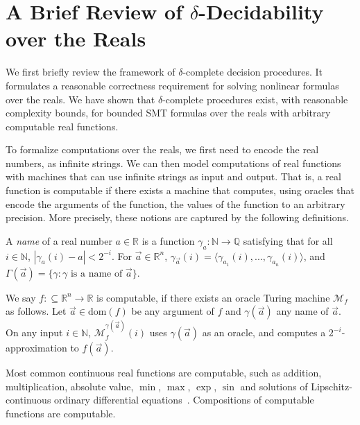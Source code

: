 \documentclass[envcountsect]{llncs}
\newcommand{\dom}{\mathrm{dom}}
\begin{document}
\section{A Brief Review of $\delta$-Decidability over the Reals}\label{review}

We first briefly review the framework of $\delta$-complete decision procedures.
It formulates a reasonable correctness requirement for solving nonlinear
formulas over the reals. We have shown that $\delta$-complete procedures exist,
with reasonable complexity bounds, for bounded SMT formulas over the reals with
arbitrary computable real functions.

To formalize computations over the reals, we first need to encode the real
numbers, as infinite strings. We can then model
computations of real functions with machines that can use infinite strings as
input and output. That is, a real function is computable if there exists a
machine that computes, using oracles that encode the arguments of the function,
the values of the function to an arbitrary precision. More precisely, these
notions are captured by the following definitions.
\begin{definition}
A {\em name} of a real number $a\in \mathbb{R}$ is a function
$\mathcal{\gamma}_a: \mathbb{N}\rightarrow \mathbb{Q}$ satisfying that for all
$i\in \mathbb{N}$, $|\gamma_a(i) - a|<2^{-i}.$ For $\vec a\in \mathbb{R}^n$,
$\gamma_{\vec a}(i) = \langle \gamma_{a_1}(i), ..., \gamma_{a_n}(i)\rangle$, and
$\Gamma(\vec a) = \{\gamma: \gamma\mbox{ is a name of }\vec a\}$.
\end{definition}
\begin{definition} We say
$f:\subseteq\mathbb{R}^n\rightarrow \mathbb{R}$ is computable, if there exists
an oracle Turing machine $\mathcal{M}_f$ as follows. Let $\vec a\in
\dom(f)$ be any argument of $f$ and $\gamma(\vec a)$
any name of $\vec a$. On any input $i\in \mathbb{N}$,
$\mathcal{M}_f^{\gamma(\vec a)}(i)$ uses $\gamma(\vec a)$ as an oracle, and
computes a $2^{-i}$-approximation to $f(\vec a)$.
\end{definition}
Most common continuous real functions are computable, such as addition,
multiplication,  absolute value, $\min$, $\max$, $\exp$, $\sin$ and solutions of
Lipschitz-continuous ordinary differential equations~\cite{CAbook}. Compositions
of computable functions are computable.
\end{document}
